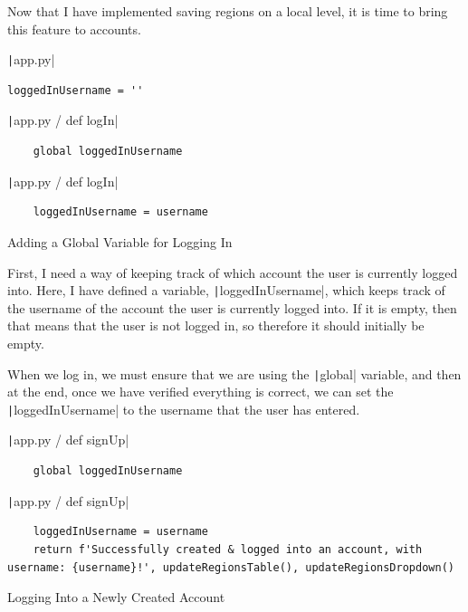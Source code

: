 \documentclass[12pt]{report}
\newcommand{\pil}[1]{\protect\texttt|#1|}
\begin{document}
\begin{center}
\end{center}

Now that I have implemented saving regions on a local level, it is time to bring this feature to accounts.

\begin{listing}[H]
\pil{app.py}
\begin{verbatim}
loggedInUsername = ''
\end{verbatim}
\pil{app.py / def logIn}
\begin{verbatim}
    global loggedInUsername
\end{verbatim}
\pil{app.py / def logIn}
\begin{verbatim}
    loggedInUsername = username
\end{verbatim}
\caption{Adding a Global Variable for Logging In}\label{cs:globalLogIn}
\end{listing}

First, I need a way of keeping track of which account the user is currently logged into. Here, I have defined a variable, \pil{loggedInUsername}, which keeps track of the username of the account the user is currently logged into. If it is empty, then that means that the user is not logged in, so therefore it should initially be empty.

When we log in, we must ensure that we are using the \pil{global} variable, and then at the end, once we have verified everything is correct, we can set the \pil{loggedInUsername} to the username that the user has entered.

\begin{listing}[H]
\pil{app.py / def signUp}
\begin{verbatim}
    global loggedInUsername
\end{verbatim}
\pil{app.py / def signUp}
\begin{verbatim}
    loggedInUsername = username
    return f'Successfully created & logged into an account, with username: {username}!', updateRegionsTable(), updateRegionsDropdown()
\end{verbatim}
\caption{Logging Into a Newly Created Account}\label{cs:logIntoNewAccount}
\end{listing}
\end{document}
